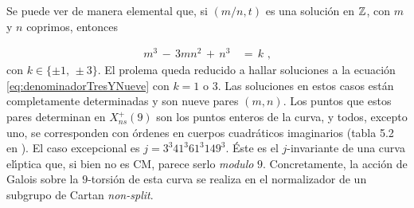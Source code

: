 Se puede ver de manera elemental que, si $(m/n,t)$ es una soluci\'{o}n en $\mathbb{Z}$,
con $m$ y $n$ coprimos, entonces

\begin{align}\label{eq:denominadorTresYNueve}
 m^{3}\,-\,3mn^{2}\,+\,n^{3} & \,=\,k\text{ ,}
\end{align}
con $k\in\{\pm 1,\,\pm 3\}$.
El prolema queda reducido a hallar soluciones a la ecuaci\'{o}n
\ref{eq:denominadorTresYNueve}
con $k=1$ o $3$. Las soluciones en estos casos est\'{a}n completamente
determinadas y son nueve pares $(m,n)$. Los puntos que estos pares determinan en
$X_{ns}^{+}(9)$ son los puntos enteros de la curva, y todos, excepto uno, se
corresponden con \'{o}rdenes en cuerpos cuadr\'{a}ticos imaginarios (tabla 5.2
en \cite{baranLevelNine}). El caso excepcional es $j=3^{3}41^{3}61^{3}149^{3}$. \'{E}ste es
el $j$-invariante de una curva el\'{\i}ptica que, si bien no es CM, parece serlo
\textit{modulo} $9$. Concretamente, la acci\'{o}n de Galois sobre la
$9$-torsi\'{o}n de esta curva se realiza en el normalizador de un subgrupo de
Cartan \textit{non-split}.